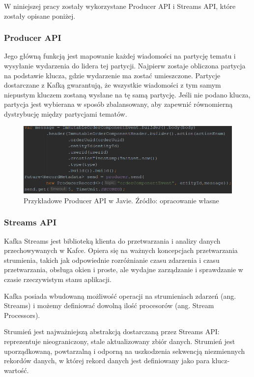 W niniejszej pracy zostały wykorzystane Producer API i Streams API, które zostały opisane poniżej.

\subsubsection{Producer API}
Jego główną funkcją jest mapowanie każdej wiadomości na partycję tematu i wysyłanie wydarzenia do lidera tej partycji. Najpierw zostaje obliczona partycja na podstawie klucza, gdzie wydarzenie ma zostać umieszczone. Partycje dostarczane z Kafką gwarantują, że wszystkie wiadomości z tym samym niepustym kluczem zostaną wysłane na tę samą partycję. Jeśli nie podano klucza, partycja jest wybierana w sposób zbalansowany, aby zapewnić równomierną dystrybucję między partycjami tematów.\cite{Producer}

\begin{figure}[h!]
  \centering
    \includegraphics[width=1.0\textwidth]{images/producerexample.PNG}
  \caption{Przykładowe Producer API w Javie. Źródło: opracowanie własne}
\end{figure}
\FloatBarrier

\subsubsection{Streams API}

Kafka Streams jest biblioteką klienta do przetwarzania i analizy danych przechowywanych w Kafce. Opiera się na ważnych koncepcjach przetwarzania strumienia, takich jak odpowiednie rozróżnianie czasu zdarzenia i czasu przetwarzania, obsługa okien i proste, ale wydajne zarządzanie i sprawdzanie w czasie rzeczywistym stanu aplikacji.\cite{Streams}

Kafka posiada wbudowaną możliwość operacji na strumieniach zdarzeń (ang. Streams) i możemy definiować dowolną ilość procesorów (ang. Stream Processors). 


Strumień jest najważniejszą abstrakcją dostarczaną przez Streams API: reprezentuje nieograniczony, stale aktualizowany zbiór danych. Strumień jest uporządkowaną, powtarzalną i odporną na uszkodzenia sekwencją niezmiennych rekordów danych, w której rekord danych jest definiowany jako para klucz-wartość.

